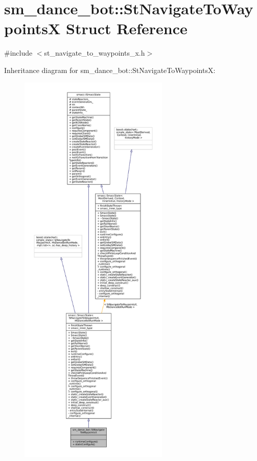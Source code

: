 \hypertarget{structsm__dance__bot_1_1StNavigateToWaypointsX}{}\section{sm\+\_\+dance\+\_\+bot\+:\+:St\+Navigate\+To\+WaypointsX Struct Reference}
\label{structsm__dance__bot_1_1StNavigateToWaypointsX}


{\ttfamily \#include $<$st\+\_\+navigate\+\_\+to\+\_\+waypoints\+\_\+x.\+h$>$}



Inheritance diagram for sm\+\_\+dance\+\_\+bot\+:\+:St\+Navigate\+To\+WaypointsX\+:
\nopagebreak
\begin{figure}[H]
\begin{center}
\leavevmode
\includegraphics[height=550pt]{structsm__dance__bot_1_1StNavigateToWaypointsX__inherit__graph}
\end{center}
\end{figure}


